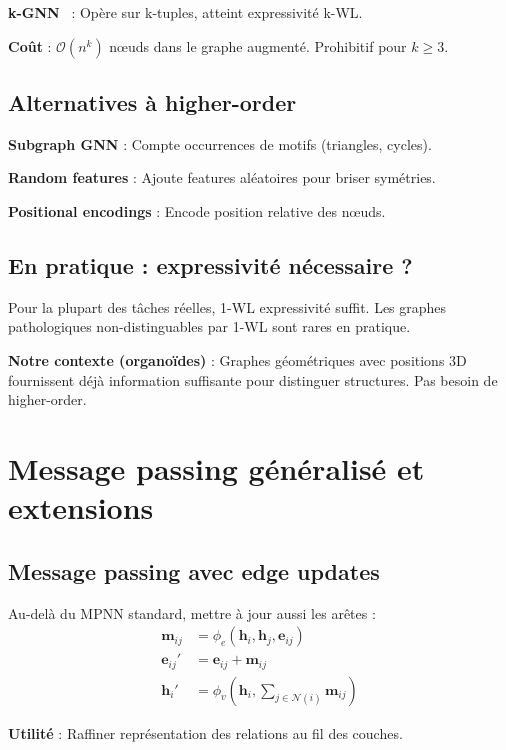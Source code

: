 \textbf{k-GNN}~\cite{Morris2019} : Opère sur k-tuples, atteint expressivité k-WL.

\textbf{Coût} : $\mathcal{O}(n^k)$ nœuds dans le graphe augmenté. Prohibitif pour $k \geq 3$.

\subsection{Alternatives à higher-order}

\textbf{Subgraph GNN} : Compte occurrences de motifs (triangles, cycles).

\textbf{Random features} : Ajoute features aléatoires pour briser symétries.

\textbf{Positional encodings} : Encode position relative des nœuds.

\subsection{En pratique : expressivité nécessaire ?}

Pour la plupart des tâches réelles, 1-WL expressivité suffit. Les graphes pathologiques non-distinguables par 1-WL sont rares en pratique.

\textbf{Notre contexte (organoïdes)} : Graphes géométriques avec positions 3D fournissent déjà information suffisante pour distinguer structures. Pas besoin de higher-order.

\section{Message passing généralisé et extensions}

\subsection{Message passing avec edge updates}

Au-delà du MPNN standard, mettre à jour aussi les arêtes :
\begin{align*}
\mathbf{m}_{ij} &= \phi_e\left(\mathbf{h}_i, \mathbf{h}_j, \mathbf{e}_{ij}\right) \\
\mathbf{e}_{ij}' &= \mathbf{e}_{ij} + \mathbf{m}_{ij} \\
\mathbf{h}_i' &= \phi_v\left(\mathbf{h}_i, \sum_{j \in \mathcal{N}(i)} \mathbf{m}_{ij}\right)
\end{align*}

\textbf{Utilité} : Raffiner représentation des relations au fil des couches.

